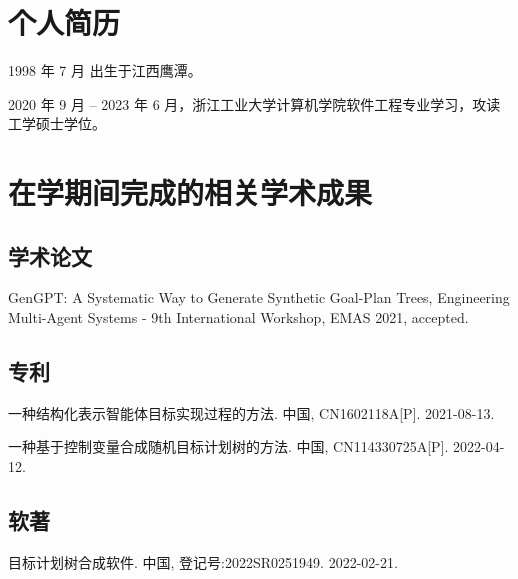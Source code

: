
\begin{resume}

  \section*{个人简历}

  1998 年 7 月 出生于江西鹰潭。

  2020 年 9 月 -- 2023 年 6 月，浙江工业大学计算机学院软件工程专业学习，攻读工学硕士学位。


  \section*{在学期间完成的相关学术成果}

  \subsection*{学术论文}

  \begin{achievements}
    \item GenGPT: A Systematic Way to Generate Synthetic Goal-Plan Trees, Engineering Multi-Agent Systems - 9th International Workshop, {EMAS}
    2021, accepted.
  \end{achievements}


  \subsection*{专利}

  \begin{achievements}
    \item  一种结构化表示智能体目标实现过程的方法. 中国, CN1602118A[P]. 2021-08-13.
    \item  一种基于控制变量合成随机目标计划树的方法. 中国, CN114330725A[P]. 2022-04-12.
  \end{achievements}

  \subsection*{软著}
  \begin{achievements}
  \item 目标计划树合成软件. 中国, 登记号:2022SR0251949. 2022-02-21.
  \end{achievements}




\end{resume}
